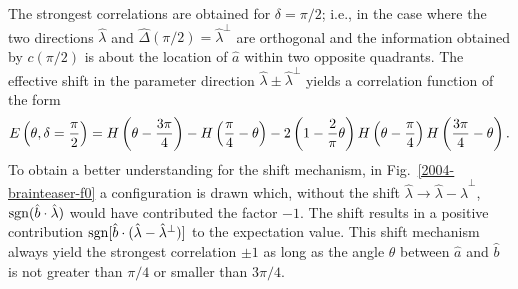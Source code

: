 \documentclass[prl,showpacs,showkeys,amsfonts,preprint]{revtex4}
\begin{document}
The strongest correlations are obtained for $\delta =\pi /2$; i.e., in the case
where the two directions ${\hat \lambda }$ and ${\hat \Delta} (\pi /2)={\hat \lambda }^\perp$
are orthogonal
and the information obtained by $c (\pi /2)$ is about the location of ${\hat a}$
within two opposite quadrants.
The effective shift in the parameter direction
${\hat \lambda } \pm {\hat \lambda }^\perp$
yields a correlation function of the form
\begin{equation}
E\left(\theta ,\delta = {\pi \over 2}\right)
=
H\left(\theta - {3 \pi\over 4}\right)
 - H\left({\pi \over 4} - \theta \right)  -
  2\left(1 - {2\over \pi}\theta \right)
H\left(\theta - {\pi\over 4}\right) H\left({3 \pi\over 4} - \theta \right)
.
\label{e-2004-brainteaser-2a}
\end{equation}
To obtain a better understanding for the shift mechanism, in
Fig.~\ref{2004-brainteaser-f0} a configuration is drawn which, without the shift
${\hat \lambda } \longrightarrow {\hat \lambda }-{\hat \lambda }^\perp$,
${\rm sgn}({\hat b} \cdot {\hat \lambda })$ would have contributed the factor $-1$.
The shift
results in
a positive contribution ${\rm sgn}[{\hat b} \cdot ({\hat \lambda }-{\hat \lambda }^\perp )]$
to the expectation value.
This shift mechanism always yield the strongest correlation $\pm 1$ as long as
the angle $\theta$ between
${\hat a}$
and
${\hat b}$
is not greater than $\pi /4$ or smaller than $3 \pi /4$.
\end{document}
